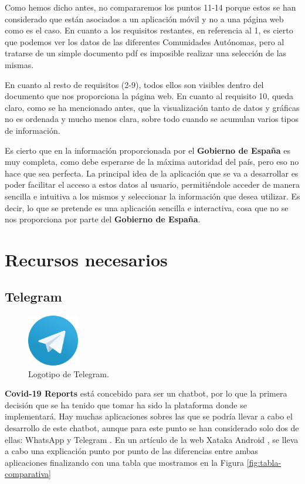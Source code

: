 Como hemos dicho antes, no compararemos los puntos 11-14 porque estos se han considerado que están asociados a un aplicación móvil y no a una página web como es el caso. En cuanto a los requisitos restantes, en referencia al 1, es cierto que podemos ver los datos de las diferentes Comunidades Autónomas, pero al tratarse de un simple documento pdf es imposible realizar una selección de las mismas.

En cuanto al resto de requisitos (2-9), todos ellos son visibles dentro del documento que nos proporciona la página web. En cuanto al requisito 10, queda claro, como se ha mencionado antes, que la visualización tanto de datos y gráficas no es ordenada y mucho menos clara, sobre todo cuando se acumulan varios tipos de información.

Es cierto que en la información proporcionada por el \textbf{Gobierno de España} es muy completa, como debe esperarse de la máxima autoridad del país, pero eso no hace que sea perfecta. La principal idea de la aplicación que se va a desarrollar es poder facilitar el acceso a estos datos al usuario, permitiéndole acceder de manera sencilla e intuitiva a los mismos y seleccionar la información que desea utilizar. Es decir, lo que se pretende es una aplicación sencilla e interactiva, cosa que no se nos proporciona por parte del \textbf{Gobierno de España}.

\section{Recursos necesarios} \label{sec:recursos}

\subsection{Telegram}

\begin{figure}[H]
	\centering
	\includegraphics[width=0.2\textwidth]{img/telegram-icon}
	\caption{Logotipo de Telegram.}
\end{figure}

\textbf{Covid-19 Reports} está concebido para ser un chatbot, por lo que la primera decisión que se ha tenido que tomar ha sido la plataforma donde se implementará. Hay muchas aplicaciones sobres las que se podría llevar a cabo el desarrollo de este chatbot, aunque para este punto se han considerado solo dos de ellas: WhatsApp \cite{whatsapp} y Telegram \cite{telegram}. En un artículo de la web Xataka Android \cite{articulo-xataka}, se lleva a cabo una explicación punto por punto de las diferencias entre ambas aplicaciones finalizando con una tabla que mostramos en la Figura \ref{fig:tabla-comparativa}

